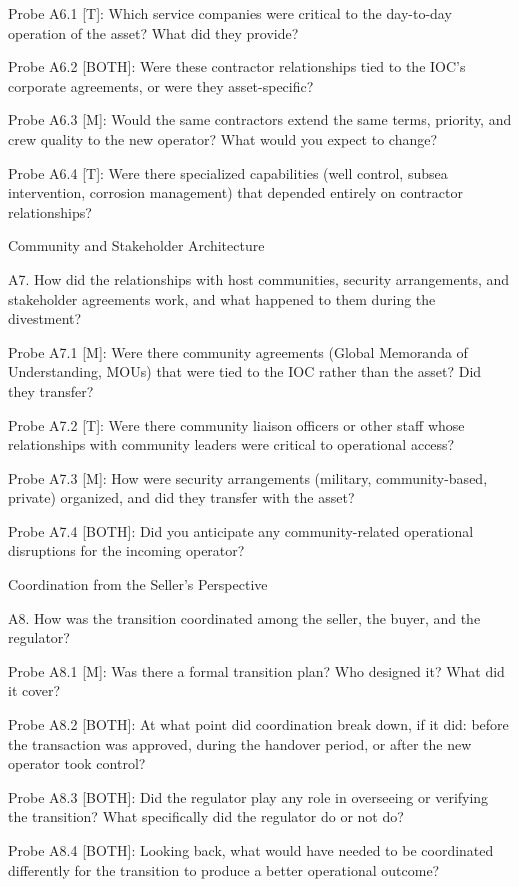\documentclass[twoside,fontset=lmodern]{mitthesis}
\begin{document}
Probe A6.1 {[}T{]}: Which service companies were critical to the
day-to-day operation of the asset? What did they provide?

Probe A6.2 {[}BOTH{]}: Were these contractor relationships tied to the
IOC's corporate agreements, or were they asset-specific?

Probe A6.3 {[}M{]}: Would the same contractors extend the same terms,
priority, and crew quality to the new operator? What would you expect to
change?

Probe A6.4 {[}T{]}: Were there specialized capabilities (well control,
subsea intervention, corrosion management) that depended entirely on
contractor relationships?

Community and Stakeholder Architecture

A7. How did the relationships with host communities, security
arrangements, and stakeholder agreements work, and what happened to them
during the divestment?

Probe A7.1 {[}M{]}: Were there community agreements (Global Memoranda of
Understanding, MOUs) that were tied to the IOC rather than the asset?
Did they transfer?

Probe A7.2 {[}T{]}: Were there community liaison officers or other staff
whose relationships with community leaders were critical to operational
access?

Probe A7.3 {[}M{]}: How were security arrangements (military,
community-based, private) organized, and did they transfer with the
asset?

Probe A7.4 {[}BOTH{]}: Did you anticipate any community-related
operational disruptions for the incoming operator?

Coordination from the Seller's Perspective

A8. How was the transition coordinated among the seller, the buyer, and
the regulator?

Probe A8.1 {[}M{]}: Was there a formal transition plan? Who designed it?
What did it cover?

Probe A8.2 {[}BOTH{]}: At what point did coordination break down, if it
did: before the transaction was approved, during the handover period, or
after the new operator took control?

Probe A8.3 {[}BOTH{]}: Did the regulator play any role in overseeing or
verifying the transition? What specifically did the regulator do or not
do?

Probe A8.4 {[}BOTH{]}: Looking back, what would have needed to be
coordinated differently for the transition to produce a better
operational outcome?
\end{document}
